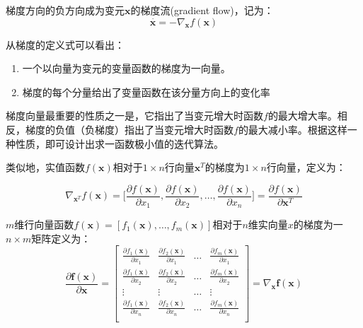 \documentclass[10pt,a4paper,UTF8]{article}
\begin{document}
梯度方向的负方向成为变元\(\mathbf{x}\)的梯度流(gradient flow)，记为：
\begin{equation}
\label{eq:3}
\overset{\cdot}{\mathbf{x}} = -\nabla_{\mathbf{x}}f(\mathbf{x})
\end{equation}

从梯度的定义式可以看出：
\begin{enumerate}
\item 一个以向量为变元的变量函数的梯度为一向量。
\item 梯度的每个分量给出了变量函数在该分量方向上的变化率
\end{enumerate}

梯度向量最重要的性质之一是，它指出了当变元增大时函数\(f\)的最大增大率。相反，梯度的负值（负梯度）指出了当变元增大时函数\(f\)的最大减小率。根据这样一种性质，即可设计出求一函数极小值的迭代算法。

类似地，实值函数\(f(\mathbf{x})\)相对于\(1\times n\)行向量\(\mathbf{x}^{T}\)的梯度为\(1\times n\)行向量，定义为：

\begin{equation}
\label{eq:4}
\nabla_{\mathbf{x}^{T}} f(\mathbf{x}) = \bigg[\frac{\partial f(\mathbf{x})}{\partial x_{1}}, \frac{\partial  f(\mathbf{x})}{\partial x_{2}}, \ldots ,\frac{\partial  f(\mathbf{x})}{\partial x_{n}} \bigg] = \frac{\partial  f(\mathbf{x})}{\partial \mathbf{x}^{T}}
\end{equation}

\(m\)维行向量函数\(f(\mathbf{x}) = [f_{1}(\mathbf{x}), \ldots ,f_{m}(\mathbf{x}) ]\)相对于\(n\)维实向量\(x\)的梯度为一\(n\times m\)矩阵定义为：
\begin{equation}
\label{eq:5}
\frac{\partial \mathbf{f}(\mathbf{x})}{\partial \mathbf{x}} =
\begin{bmatrix}
\frac{\partial f_{1}(\mathbf{x})}{\partial x_{1}} & \frac{\partial f_{2}(\mathbf{x})}{\partial x_{1}} & \ldots &\frac{\partial f_{m}(\mathbf{x})}{\partial x_{1}} \\
\frac{\partial f_{1}(\mathbf{x})}{\partial x_{2}} & \frac{\partial f_{2}(\mathbf{x})}{\partial x_{2}} & \ldots &\frac{\partial f_{m}(\mathbf{x})}{\partial x_{2}} \\
\vdots & \vdots & \ldots & \vdots \\
\frac{\partial f_{1}(\mathbf{x})}{\partial x_{n}} & \frac{\partial f_{2}(\mathbf{x})}{\partial x_{n}} & \ldots &\frac{\partial f_{m}(\mathbf{x})}{\partial x_{n}} \\
\end{bmatrix}
= \nabla_{\mathbf{x}}\mathbf{f}(\mathbf{x})
\end{equation}
\end{document}
